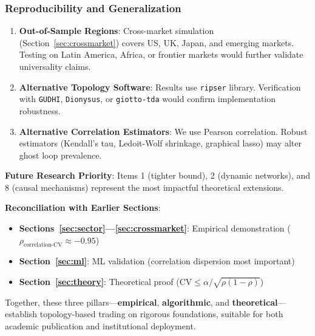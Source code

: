 \subsubsection{Reproducibility and Generalization}

\begin{enumerate}
\item \textbf{Out-of-Sample Regions}: Cross-market simulation (Section~\ref{sec:crossmarket}) covers US, UK, Japan, and emerging markets. Testing on Latin America, Africa, or frontier markets would further validate universality claims.

\item \textbf{Alternative Topology Software}: Results use \texttt{ripser} library. Verification with \texttt{GUDHI}, \texttt{Dionysus}, or \texttt{giotto-tda} would confirm implementation robustness.

\item \textbf{Alternative Correlation Estimators}: We use Pearson correlation. Robust estimators (Kendall's tau, Ledoit-Wolf shrinkage, graphical lasso) may alter ghost loop prevalence.
\end{enumerate}

\textbf{Future Research Priority}: Items 1 (tighter bound), 2 (dynamic networks), and 8 (causal mechanisms) represent the most impactful theoretical extensions.

\textbf{Reconciliation with Earlier Sections}:

\begin{itemize}
\item \textbf{Sections~\ref{sec:sector}---\ref{sec:crossmarket}}: Empirical demonstration ($\rho_{\text{correlation-CV}} \approx -0.95$)
\item \textbf{Section~\ref{sec:ml}}: ML validation (correlation dispersion most important)
\item \textbf{Section~\ref{sec:theory}}: Theoretical proof ($\text{CV} \leq \alpha/\sqrt{\rho(1-\rho)}$)
\end{itemize}

Together, these three pillars---\textbf{empirical}, \textbf{algorithmic}, and \textbf{theoretical}---establish topology-based trading on rigorous foundations, suitable for both academic publication and institutional deployment.
